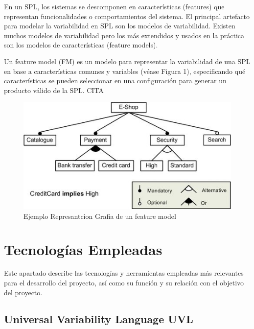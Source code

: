 \documentclass[12pt, a4paper, twoside]{article}
\begin{document}
En un SPL, los sistemas se descomponen en características (features) que representan funcionalidades o comportamientos del sistema. 
El principal artefacto para modelar la variabilidad en SPL son los modelos de variabilidad. Existen muchos modelos 
de variabilidad pero los más extendidos y usados en la práctica son los modelos de características (feature models). 

Un feature model (FM) \cite{wikipedia_feature_model} es un modelo para representar la variabilidad de una SPL en base a características comunes y 
variables (véase Figura 1), especificando qué características se pueden seleccionar en una configuración para generar 
un producto válido de la SPL. CITA 

\begin{figure}[ht]
	\centering
		\includegraphics[width=1\textwidth]{fm.example.jpg}
	\caption{Ejemplo Represantcion Grafia de un feature model \cite{wikipedia_feature_model}}
\end{figure}












\section{Tecnologías Empleadas}
\label{sec:Tecnologias Empleadas}
Este apartado describe las tecnologías y herramientas empleadas más relevantes para el desarrollo del proyecto, así como su función y su relación con el objetivo del proyecto.

\subsection{Universal Variability Language UVL}
\end{document}
